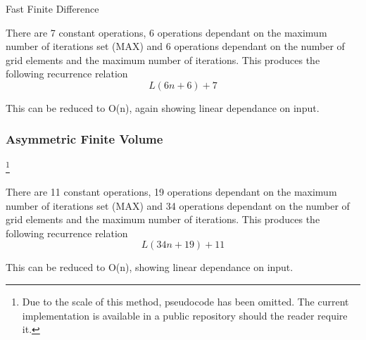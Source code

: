 \documentclass[aps,twocolumn,pre,nofootinbib,10pt]{revtex4-1}
\begin{document}
\begin{algorithm}
    \caption{Fast Finite Difference}
    \label{alg:ffd}
    \begin{algorithmic}[1]
                            \EndIf
                        \EndIf
                    \EndFor
                \EndFor
            \EndFor
        \EndFunction
    \end{algorithmic}
\end{algorithm}

There are 7 constant operations, 6 operations dependant on the maximum number of iterations set (MAX) and 6 operations dependant on the number of grid elements and the maximum number of iterations. This produces the following recurrence relation \[L(6n + 6) + 7\]

This can be reduced to O(n), again showing linear dependance on input.

\subsubsection{Asymmetric Finite Volume}

\footnote{Due to the scale of this method, pseudocode has been omitted. The current implementation is available in a public repository should the reader require it.}

There are 11 constant operations, 19 operations dependant on the maximum number of iterations set (MAX) and 34 operations dependant on the number of grid elements and the maximum number of iterations. This produces the following recurrence relation \[L(34n+19)+11\]

This can be reduced to O(n), showing linear dependance on input.
\end{document}
